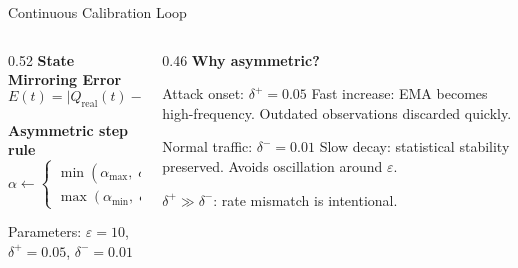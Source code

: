 \documentclass[aspectratio=169,t]{beamer}
\newcommand{\qreal}{Q_{\mathrm{real}}}
\newcommand{\qvirt}{Q_{\mathrm{virtual}}}
\begin{document}
\begin{frame}{Continuous Calibration Loop}

  \begin{columns}[T]
    \begin{column}{0.52\textwidth}
      \textbf{State Mirroring Error}
      \[
        E(t) = \bigl|\qreal(t) - \qvirt(t)\bigr|
      \]

      \vspace{6pt}
      \textbf{Asymmetric step rule}
      \[
        \alpha \leftarrow \begin{cases}
          \min(\alpha_{\max},\;\alpha + \delta^{+}) & E > \varepsilon \\
          \max(\alpha_{\min},\;\alpha - \delta^{-}) & \text{otherwise}
        \end{cases}
      \]

      \vspace{4pt}
      {\small Parameters: $\varepsilon = 10$,\;
                  $\delta^{+} = 0.05$,\;
                  $\delta^{-} = 0.01$}
    \end{column}

    \begin{column}{0.46\textwidth}
      \textbf{Why asymmetric?}

      \vspace{6pt}
      \begin{block}{\small Attack onset: $\delta^{+} = 0.05$}
        \small
        Fast increase: EMA becomes high-frequency.
        Outdated observations discarded quickly.
      \end{block}

      \vspace{6pt}
      \begin{exampleblock}{\small Normal traffic: $\delta^{-} = 0.01$}
        \small
        Slow decay: statistical stability preserved.
        Avoids oscillation around $\varepsilon$.
      \end{exampleblock}

      \vspace{6pt}
      {\small $\delta^{+} \gg \delta^{-}$: rate mismatch is intentional.}
    \end{column}
  \end{columns}

\end{frame}
\end{document}
